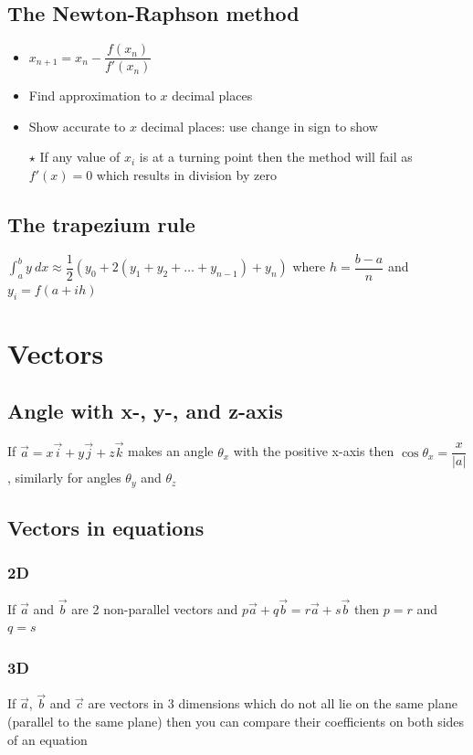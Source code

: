 \documentclass[A4paper]{article}
\begin{document}
	\subsection{The Newton-Raphson method}
	\begin{itemize}
		\item $x_{n+1}=x_n-\dfrac{f(x_n)}{f'(x_n)}$
		\item Find approximation to $x$ decimal places
		\item Show accurate to $x$ decimal places: use change in sign to show
		\item[$\star$] If any value of $x_i$ is at a turning point then the method will fail as $f'(x)=0$ which results in division by zero
	\end{itemize}
	
	\subsection{The trapezium rule}
	$\int_{a}^{b}y\:dx \approx \dfrac{1}{2} (y_0+2(y_1+y_2+\dots+y_{n-1})+y_n)$ where $h=\dfrac{b-a}{n}$ and $y_i=f(a+ih)$


	\pagebreak

	\section{Vectors}
	\subsection{Angle with x-, y-, and z-axis}
	If $\vec{a}=x\vec{i}+y\vec{j}+z\vec{k}$ makes an angle $\theta_x$ with the positive x-axis then $\cos \theta_x=\dfrac{x}{|a|}$, similarly for angles $\theta_y$ and $\theta_z$
	\subsection{Vectors in equations}
	\subsubsection{2D}
	If $\vec{a}$ and $\vec{b}$ are 2 non-parallel vectors and $p\vec{a}+q\vec{b}=r\vec{a}+s\vec{b}$ then $p=r$ and $q=s$
	\subsubsection{3D}
	If $\vec{a}$, $\vec{b}$ and $\vec{c}$ are vectors in 3 dimensions which do not all lie on the same plane (parallel to the same plane) then you can compare their coefficients on both sides of an equation

	
\end{document}

